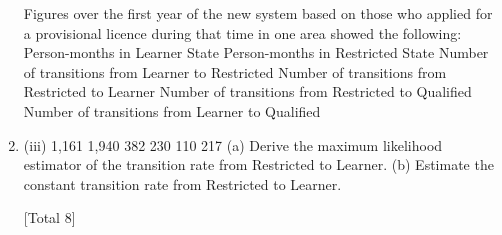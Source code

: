 \documentclass[a4paper,12pt]{article}
\begin{document}
\begin{enumerate}
Figures over the first year of the new system based on those who applied for a
provisional licence during that time in one area showed the following:
Person-months in Learner State
Person-months in Restricted State
Number of transitions from Learner to Restricted
Number of transitions from Restricted to Learner
Number of transitions from Restricted to Qualified
Number of transitions from Learner to Qualified
\item (iii)
1,161
1,940
382
230
110
217
(a) Derive the maximum likelihood estimator of the transition rate from
Restricted to Learner.
(b) Estimate the constant transition rate from Restricted to Learner.
 
[Total 8]


\newpage



\end{enumerate}
\end{document}
